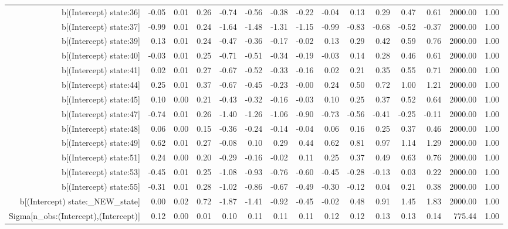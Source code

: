 \begin{table}[ht]
\begin{tabular}{rrrrrrrrrrrrrrr}
  b[(Intercept) state:36] & -0.05 & 0.01 & 0.26 & -0.74 & -0.56 & -0.38 & -0.22 & -0.04 & 0.13 & 0.29 & 0.47 & 0.61 & 2000.00 & 1.00 \\ 
  b[(Intercept) state:37] & -0.99 & 0.01 & 0.24 & -1.64 & -1.48 & -1.31 & -1.15 & -0.99 & -0.83 & -0.68 & -0.52 & -0.37 & 2000.00 & 1.00 \\ 
  b[(Intercept) state:39] & 0.13 & 0.01 & 0.24 & -0.47 & -0.36 & -0.17 & -0.02 & 0.13 & 0.29 & 0.42 & 0.59 & 0.76 & 2000.00 & 1.00 \\ 
  b[(Intercept) state:40] & -0.03 & 0.01 & 0.25 & -0.71 & -0.51 & -0.34 & -0.19 & -0.03 & 0.14 & 0.28 & 0.46 & 0.61 & 2000.00 & 1.00 \\ 
  b[(Intercept) state:41] & 0.02 & 0.01 & 0.27 & -0.67 & -0.52 & -0.33 & -0.16 & 0.02 & 0.21 & 0.35 & 0.55 & 0.71 & 2000.00 & 1.00 \\ 
  b[(Intercept) state:44] & 0.25 & 0.01 & 0.37 & -0.67 & -0.45 & -0.23 & -0.00 & 0.24 & 0.50 & 0.72 & 1.00 & 1.21 & 2000.00 & 1.00 \\ 
  b[(Intercept) state:45] & 0.10 & 0.00 & 0.21 & -0.43 & -0.32 & -0.16 & -0.03 & 0.10 & 0.25 & 0.37 & 0.52 & 0.64 & 2000.00 & 1.00 \\ 
  b[(Intercept) state:47] & -0.74 & 0.01 & 0.26 & -1.40 & -1.26 & -1.06 & -0.90 & -0.73 & -0.56 & -0.41 & -0.25 & -0.11 & 2000.00 & 1.00 \\ 
  b[(Intercept) state:48] & 0.06 & 0.00 & 0.15 & -0.36 & -0.24 & -0.14 & -0.04 & 0.06 & 0.16 & 0.25 & 0.37 & 0.46 & 2000.00 & 1.00 \\ 
  b[(Intercept) state:49] & 0.62 & 0.01 & 0.27 & -0.08 & 0.10 & 0.29 & 0.44 & 0.62 & 0.81 & 0.97 & 1.14 & 1.29 & 2000.00 & 1.00 \\ 
  b[(Intercept) state:51] & 0.24 & 0.00 & 0.20 & -0.29 & -0.16 & -0.02 & 0.11 & 0.25 & 0.37 & 0.49 & 0.63 & 0.76 & 2000.00 & 1.00 \\ 
  b[(Intercept) state:53] & -0.45 & 0.01 & 0.25 & -1.08 & -0.93 & -0.76 & -0.60 & -0.45 & -0.28 & -0.13 & 0.03 & 0.22 & 2000.00 & 1.00 \\ 
  b[(Intercept) state:55] & -0.31 & 0.01 & 0.28 & -1.02 & -0.86 & -0.67 & -0.49 & -0.30 & -0.12 & 0.04 & 0.21 & 0.38 & 2000.00 & 1.00 \\ 
  b[(Intercept) state:\_NEW\_state] & 0.00 & 0.02 & 0.72 & -1.87 & -1.41 & -0.92 & -0.45 & -0.02 & 0.48 & 0.91 & 1.45 & 1.83 & 2000.00 & 1.00 \\ 
  Sigma[n\_obs:(Intercept),(Intercept)] & 0.12 & 0.00 & 0.01 & 0.10 & 0.11 & 0.11 & 0.11 & 0.12 & 0.12 & 0.13 & 0.13 & 0.14 & 775.44 & 1.00 \\ 

\end{tabular}
\end{table}
